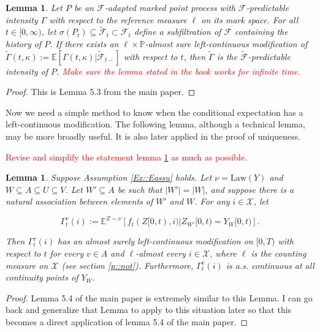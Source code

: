 \documentclass[12pt]{article}
\newcommand{\mb}{\mathbb}
\newcommand{\mc}{\mathcal}
\newcommand{\te}{\text}
\newcommand{\tr}{\textcolor{red}}
\newcommand{\ind}{\hspace{24pt}}
\newcommand{\pr}{\mb{P}}							%
\newcommand{\ex}[1]{\mb{E}\left[#1\right]}			%
\newcommand{\exmu}[2]{\mb{E}^{#1}\left[#2\right]}	%
\newcommand{\defeq}{:=}								%
\newcommand{\sta}{\mc{X}}							%
\newcommand{\Sm}{\ell}								%
\newcommand{\F}{\mc{F}}								%
\newcommand{\vind}[1]{_{#1}}						%
\newcommand{\tmi}[1]{#1}							%
\newcommand{\vpara}[1]{^{#1}}						%
\newcommand{\tpara}[1]{_{#1}}						%
\newcommand{\Xg}{Y}									%
\newcommand{\alt}[1]{\tilde{#1}}					%
\renewcommand{\mark}{\kappa}						%
\newcommand{\ratee}{\Gamma}							%
\newcommand{\cratee}{\alt{\ratee}}					%
\newcommand{\rp}{P}									%
\newcommand{\mm}{\nu}								%
\newcommand{\law}{\te{Law}}							%
\newcommand{\Xh}{Z}									%
\newtheorem{lem}[thms]{Lemma}
\begin{document}
\begin{lem}
Let \(\rp\) be an \(\F\)-adapted marked point process with \(\F\)-predictable intensity \(\ratee\) with respect to the reference measure \(\Sm\) on its mark space. For all \(t \in [0,\infty)\), let \(\sigma(\rp_{t}) \subseteq \alt{\F}_{t}\subset \F_{t}\) define a subfiltration of \(\F\) containing the history of \(\rp\). If there exists an \(\ell\times \pr\)-almost sure left-continuous modification of \(\cratee(t,\mark) := \ex{\ratee(t,\mark)|\alt{\F}_{t-}}\) with respect to \(t\), then \(\cratee\) is the \(\alt{\F}\)-predictable intensity of \(\rp\). \tr{Make sure the lemma stated in the book works for infinite time.}
\label{Ex::filtering}
\end{lem}

\begin{proof}
This is Lemma 5.3 from the main paper.
\end{proof}

Now we need a simple method to know when the conditional expectation has a left-continuous modification. The following lemma, although a technical lemma, may be more broadly useful. It is also later applied in the proof of uniqueness.

\ind \tr{Revise and simplify the statement lemma \ref{Ex::leftmod} as much as possible.}
\begin{lem}
Suppose Assumption \ref{Ex::Eassu} holds. Let \(\mm = \law(\Xg)\) and \(W\subseteq A \subseteq U\subseteq V\). Let \(W'\subseteq A\) be such that \(|W'| = |W|\), and suppose there is a natural association between elements of \(W'\) and \(W\). For any \(i \in \sta\), let

\[\ratee\vpara{v}\tpara{t}(i) \defeq \exmu{\Xh\sim \mm}{f_t(\Xh\tmi{[0,t)},i)|\Xh\vind{W'}\tmi{[0,t)} = \Xg\vind{W}\tmi{[0,t)}}.\]

Then \(\ratee\vpara{v}\tpara{t}(i)\) has an almost surely left-continuous modification on \([0,T)\) with respect to \(t\) for every \(v \in A\) and \(\ell\)-almost every \(i \in \sta\), where \(\ell\) is the counting measure on \(\sta\) (see section \ref{p::not}). Furthermore, \(\ratee\vpara{v}\tpara{t}(i)\) is a.s. continuous at all continuity points of \(\Xg\vind{W}\).
\label{Ex::leftmod}
\end{lem}
\begin{proof}
Lemma 5.4 of the main paper is extremely similar to this Lemma. I can go back and generalize that Lemma to apply to this situation later so that this becomes a direct application of lemma 5.4 of the main paper.
\end{proof}
\end{document}
